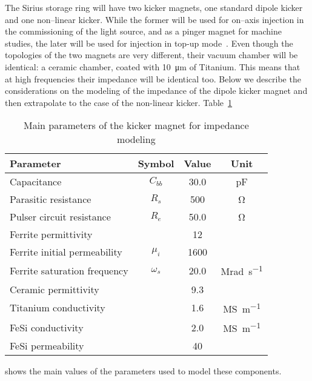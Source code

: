     The Sirius storage ring will have two kicker magnets, one standard dipole kicker and one non--linear kicker. While the former will be used for on--axis injection in the commissioning of the light source, and as a pinger magnet for machine studies, the later will be used for injection in top-up mode~\cite{Liu2016a}. Even though the topologies of the two magnets are very different, their vacuum chamber will be identical: a ceramic chamber, coated with \SI{10}{\micro\meter} of Titanium. This means that at high frequencies their impedance will be identical too. Below we describe the considerations on the modeling of the impedance of the dipole kicker magnet and then extrapolate to the case of the non-linear kicker. Table~\ref{tab:kicker_paramters}
    \begin{table}
        \centering
        \caption{Main parameters of the kicker magnet for impedance modeling}
        \label{tab:kicker_paramters}
        \begin{tabular}{lccc}
            \toprule
            Parameter                     & Symbol    & Value  & Unit \\
            \midrule
            Capacitance                   & $C_{bb}$  &  30.0  & \si{\pico\farad}\\
            Parasitic resistance          & $R_s$     &  500   & \si{\ohm}\\
            Pulser circuit resistance     & $R_e$     &  50.0  & \si{\ohm}\\
            Ferrite permittivity          &           &   12   & \\
            Ferrite initial permeability  & $\mu_i$   &  1600  & \\
            Ferrite saturation frequency  & $\omega_s$&  20.0  & \si{\mega\radian\per\second}\\
            Ceramic permittivity          &           &  9.3   & \\
            Titanium conductivity         &           &  1.6   & \si{\mega\siemens\per\meter}\\
            FeSi conductivity             &           &  2.0   & \si{\mega\siemens\per\meter}\\
            FeSi permeability             &           & 40     & \\
            \bottomrule
        \end{tabular}
    \end{table}
    shows the main values of the parameters used to model these components.

